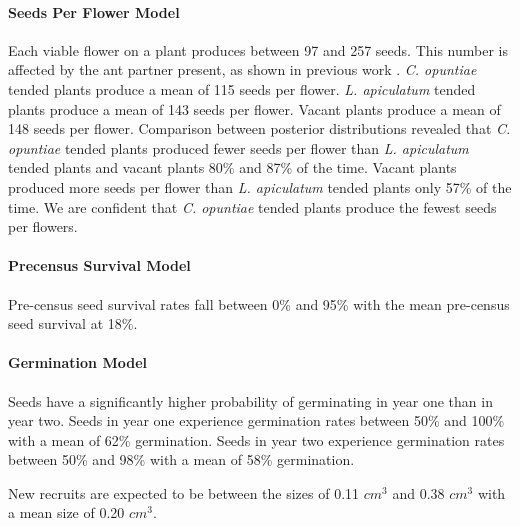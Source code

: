 \documentclass[11pt]{article}
\begin{document}
\paragraph{Seeds Per Flower Model}
Each viable flower on a plant produces between 97 and 257 seeds.
This number is affected by the ant partner present, as shown in previous work \citep{Ohm2014}. 
\textit{C. opuntiae} tended plants produce a mean of 115 seeds per flower. 
\textit{L. apiculatum} tended plants produce a mean of 143 seeds per flower.
Vacant plants produce a mean of 148 seeds per flower. 
Comparison between posterior distributions revealed that \textit{C. opuntiae} tended plants produced fewer seeds per flower than \textit{L. apiculatum} tended plants and vacant plants 80\% and 87\% of the time.
Vacant plants produced more seeds per flower than \textit{L. apiculatum} tended plants only 57\% of the time.
We are confident that \textit{C. opuntiae} tended plants produce the fewest seeds per flowers.

	\paragraph{Precensus Survival Model}
	Pre-census seed survival rates fall between 0\% and 95\% with the mean pre-census seed survival at 18\%.
	
	\paragraph{Germination Model}
	Seeds have a significantly higher probability of germinating in year one than in year two.
	Seeds in year one experience germination rates between 50\% and 100\% with a mean of 62\% germination.
	Seeds in year two experience germination rates between 50\% and 98\% with a mean of 58\% germination.
	
	
	New recruits are expected to be between the sizes of 0.11 $cm^3$ and 0.38 $cm^3$ with a mean size of 0.20 $cm^3$.
\end{document}
